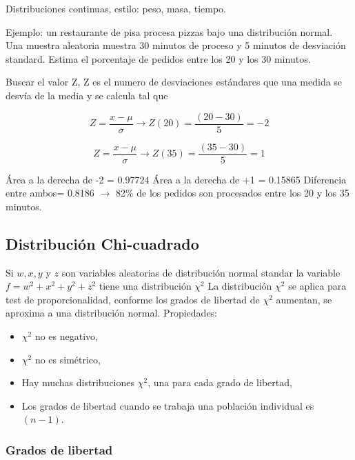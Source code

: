 \documentclass[]{article}
\begin{document}
Distribuciones continuas, estilo: peso, masa, tiempo. 

Ejemplo: un restaurante de pisa procesa pizzas bajo una distribución normal. Una muestra aleatoria muestra 30 minutos de proceso y 5 minutos de desviación standard. Estima el porcentaje de pedidos entre los 20 y los 30 minutos.

Buscar el valor Z, Z es el numero de desviaciones estándares que una medida se desvía de la media y se calcula tal que

\begin{equation}
Z = \frac{x - \mu}{\sigma} \longrightarrow Z(20) = \frac{(20-30)}{5} = -2
\end{equation}

\begin{equation}
Z = \frac{x - \mu}{\sigma} \longrightarrow Z(35) = \frac{(35-30)}{5} = 1
\end{equation}

Área a la derecha de -2 = 0.97724 \newline
Área a la derecha de +1 = 0.15865 \newline
Diferencia entre ambos= 0.8186 $\longrightarrow$ 82\% de los pedidos son procesados entre los 20 y los 35 minutos.


\subsection{Distribución Chi-cuadrado}

Si $w, x, y$ y $z$ son variables aleatorias de distribución normal standar la variable $f = w^2 + x^2 + y^2 + z^2$ tiene una distribución $\chi^2$
La distribución $\chi^2$ se aplica para test de proporcionalidad, conforme los grados de libertad de $\chi^2$ aumentan, se aproxima a una distribución normal. Propiedades:

\begin{itemize}
	\item $\chi^2$ no es negativo,
	\item $\chi^2$ no es simétrico,
	\item Hay muchas distribuciones $\chi^2$, una para cada grado de libertad,
	\item Los grados de libertad cuando se trabaja una población individual es $(n-1)$.
\end{itemize}


\subsubsection{Grados de libertad}
\end{document}
